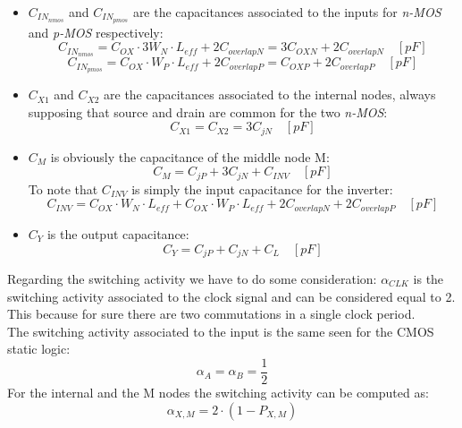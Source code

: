 \documentclass[12pt,  english, makeidx, a4paper, titlepage, oneside]{article}
\begin{document}
\begin{itemize}
\item $ C_{IN_{nmos}} $ and $ C_{IN_{pmos}} $ are the capacitances associated to the inputs for \textit{n-MOS} and \textit{p-MOS} respectively:\\
\begin{equation}
C_{IN_{nmos}}=C_{OX} \cdot 3W_N\cdot L_{eff}+2C_{overlapN} = 3 C_{OXN}+ 2C_{overlapN} \quad [pF]
\end{equation}
\begin{equation}
C_{IN_{pmos}}=C_{OX} \cdot W_P\cdot L_{eff}+2C_{overlapP}
= C_{OXP}+ 2C_{overlapP} \quad [pF]
\end{equation}
\item $ C_{X1} $ and $ C_{X2} $ are the capacitances associated to the internal nodes, always supposing that source and drain are common for the two \textit{n-MOS}:\\
\begin{equation}
C_{X1}=C_{X2}=3C_{jN} \quad [pF]
\end{equation}
\item $ C_M $ is obviously the capacitance of the middle node M:
\begin{equation}
C_{M}=C_{jP}+3C_{jN}+C_{INV} \quad [pF]
\end{equation}
To note that $C_{INV}$ is simply the input capacitance for the inverter:
	\begin{equation}
	C_{INV}= C_{OX} \cdot W_N \cdot L_{eff} + C_{OX} \cdot W_P \cdot L_{eff} + 2C_{overlapN}+ 2C_{overlapP} \quad [pF]
	\end{equation}
\item $ C_Y $ is the output capacitance:
\begin{equation}
C_{Y}=C_{jP}+C_{jN}+C_{L} \quad [pF]
\end{equation}

\end{itemize}
Regarding the switching activity we have to do some consideration:
$ \alpha_{CLK} $ is the switching activity associated to the clock signal and can be considered equal to 2. This because for sure there are two commutations in a single clock period.\\ 
The switching activity associated to the input is the same seen for the CMOS static logic:
\begin{equation}
\alpha_A = \alpha_B = \frac{1}{2}
\end{equation}
For the internal and the M nodes the switching activity can be computed as:
\begin{equation}
\alpha_{X,M} = 2 \cdot (1-P_{X,M})
\end{equation}
\end{document}
